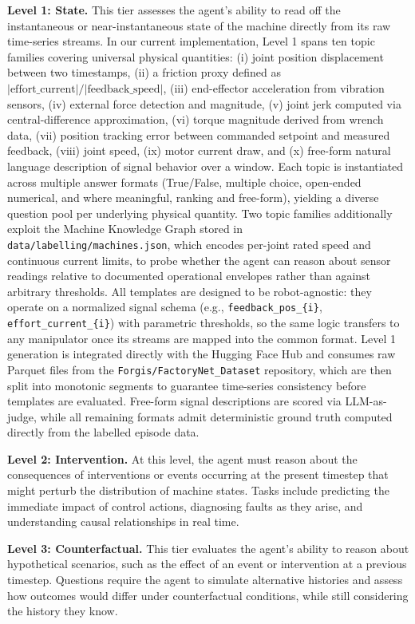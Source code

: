\documentclass{article}
\begin{document}
\textbf{Level 1: State.} This tier assesses the agent's ability to read off the instantaneous or near-instantaneous state of the machine directly from its raw time-series streams. In our current implementation, Level 1 spans ten topic families covering universal physical quantities: (i) joint position displacement between two timestamps, (ii) a friction proxy defined as $|\text{effort\_current}|/|\text{feedback\_speed}|$, (iii) end-effector acceleration from vibration sensors, (iv) external force detection and magnitude, (v) joint jerk computed via central-difference approximation, (vi) torque magnitude derived from wrench data, (vii) position tracking error between commanded setpoint and measured feedback, (viii) joint speed, (ix) motor current draw, and (x) free-form natural language description of signal behavior over a window. Each topic is instantiated across multiple answer formats (True/False, multiple choice, open-ended numerical, and where meaningful, ranking and free-form), yielding a diverse question pool per underlying physical quantity. Two topic families additionally exploit the Machine Knowledge Graph stored in \texttt{data/labelling/machines.json}, which encodes per-joint rated speed and continuous current limits, to probe whether the agent can reason about sensor readings relative to documented operational envelopes rather than against arbitrary thresholds. All templates are designed to be robot-agnostic: they operate on a normalized signal schema (e.g., \texttt{feedback\_pos\_\{i\}}, \texttt{effort\_current\_\{i\}}) with parametric thresholds, so the same logic transfers to any manipulator once its streams are mapped into the common format. Level 1 generation is integrated directly with the Hugging Face Hub and consumes raw Parquet files from the \texttt{Forgis/FactoryNet\_Dataset} repository, which are then split into monotonic segments to guarantee time-series consistency before templates are evaluated. Free-form signal descriptions are scored via LLM-as-judge, while all remaining formats admit deterministic ground truth computed directly from the labelled episode data.

\textbf{Level 2: Intervention.} At this level, the agent must reason about the consequences of interventions or events occurring at the present timestep that might perturb the distribution of machine states. Tasks include predicting the immediate impact of control actions, diagnosing faults as they arise, and understanding causal relationships in real time.

\textbf{Level 3: Counterfactual.} This tier evaluates the agent's ability to reason about hypothetical scenarios, such as the effect of an event or intervention at a previous timestep. Questions require the agent to simulate alternative histories and assess how outcomes would differ under counterfactual conditions, while still considering the history they know.
\end{document}
